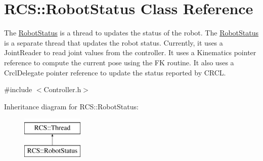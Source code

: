 \hypertarget{classRCS_1_1RobotStatus}{\section{R\-C\-S\-:\-:Robot\-Status Class Reference}
\label{classRCS_1_1RobotStatus}
}


The \hyperlink{classRCS_1_1RobotStatus}{Robot\-Status} is a thread to updates the status of the robot. The \hyperlink{classRCS_1_1RobotStatus}{Robot\-Status} is a separate thread that updates the robot status. Currently, it uses a Joint\-Reader to read joint values from the controller. It uses a Kinematics pointer reference to compute the current pose using the F\-K routine. It also uses a Crcl\-Delegate pointer reference to update the status reported by C\-R\-C\-L.  




{\ttfamily \#include $<$Controller.\-h$>$}

Inheritance diagram for R\-C\-S\-:\-:Robot\-Status\-:\begin{figure}[H]
\begin{center}
\leavevmode
\includegraphics[height=2.000000cm]{classRCS_1_1RobotStatus}
\end{center}
\end{figure}

